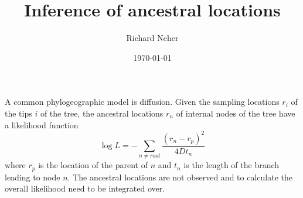 \documentclass[aps,rmp, onecolumn]{revtex4}
\begin{document}
\title{Inference of ancestral locations}
\author{Richard Neher}
\date{\today}
\maketitle
A common phylogeographic model is diffusion.
Given the sampling locations $r_i$ of the tips $i$ of the tree, the ancestral locations $r_n$ of internal nodes of the tree have a likelihood function
\begin{equation}
    \log L = -\sum_{n\neq root} \frac{(r_n - r_p)^2}{4Dt_n}
\end{equation}
where $r_p$ is the location of the parent of $n$ and $t_n$ is the length of the branch leading to node $n$.
The ancestral locations are not observed and to calculate the overall likelihood need to be integrated over.
\end{document}
